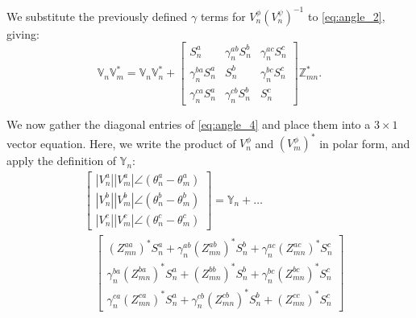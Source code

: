 \noindent We substitute the previously defined $\gamma$ terms for $V_{n}^{\phi} {\left( V_{n}^{\psi} \right)}^{-1}$ to \eqref{eq:angle_2}, giving:
\begin{equation}
	\mathbb{V}_{n} \mathbb{V}_{m}^* = \mathbb{V}_{n} \mathbb{V}_{n}^* + \begin{bmatrix}
    	S_{n}^{a} & \gamma_{n}^{ab} S_{n}^{b} & \gamma_{n}^{ac} S_{n}^{c} \\
        \gamma_{n}^{ba} S_{n}^{a} & S_{n}^{b} & \gamma_{n}^{bc} S_{n}^{c} \\
        \gamma_{n}^{ca} S_{n}^{a} & \gamma_{n}^{cb} S_{n}^{b} & S_{n}^{c}
    \end{bmatrix} \mathbb{Z}_{mn}^{*}.
    \label{eq:angle_4}
\end{equation}

We now gather the diagonal entries of \eqref{eq:angle_4} and place them into a $3 \times 1$ vector equation. Here, we write the product of $V_{n}^{\phi}$ and $\left( V_{m}^{\phi} \right)^{*}$ in polar form, and apply the definition of $\mathbb{Y}_{n}$:
\begin{align}
	& \begin{bmatrix}
    	\left| V_{n}^{a} \right| \left| V_{m}^{a} \right| \angle \left( \theta_{n}^{a} - \theta_{m}^{a} \right) \\
        \left| V_{n}^{b} \right| \left| V_{m}^{b} \right| \angle \left( \theta_{n}^{b} - \theta_{m}^{b} \right) \\
        \left| V_{n}^{c} \right| \left| V_{m}^{c} \right| \angle \left( \theta_{n}^{c} - \theta_{m}^{c} \right)
    \end{bmatrix}
	= \mathbb{Y}_{n} + \ldots \nonumber \\
    & \quad
    \begin{bmatrix}
    	{\left( Z_{mn}^{aa} \right)}^{*} S_{n}^{a}  + \gamma_{n}^{ab} {\left( Z_{mn}^{ab} \right)}^{*} S_{n}^{b}  + \gamma_{n}^{ac} {\left( Z_{mn}^{ac} \right)}^{*} S_{n}^{c} \\
    	\gamma_{n}^{ba} {\left( Z_{mn}^{ba} \right)}^{*} S_{n}^{a} + {\left( Z_{mn}^{bb} \right)}^{*} S_{n}^{b} + \gamma_{n}^{bc} {\left( Z_{mn}^{bc} \right)}^{*} S_{n}^{c} \\
    	\gamma_{n}^{ca} {\left( Z_{mn}^{ca} \right)}^{*} S_{n}^{a} + \gamma_{n}^{cb} {\left( Z_{mn}^{cb} \right)}^{*} S_{n}^{b} + {\left( Z_{mn}^{cc} \right)}^{*} S_{n}^{c}
    \end{bmatrix}
    \label{eq:angle_5}
\end{align}

